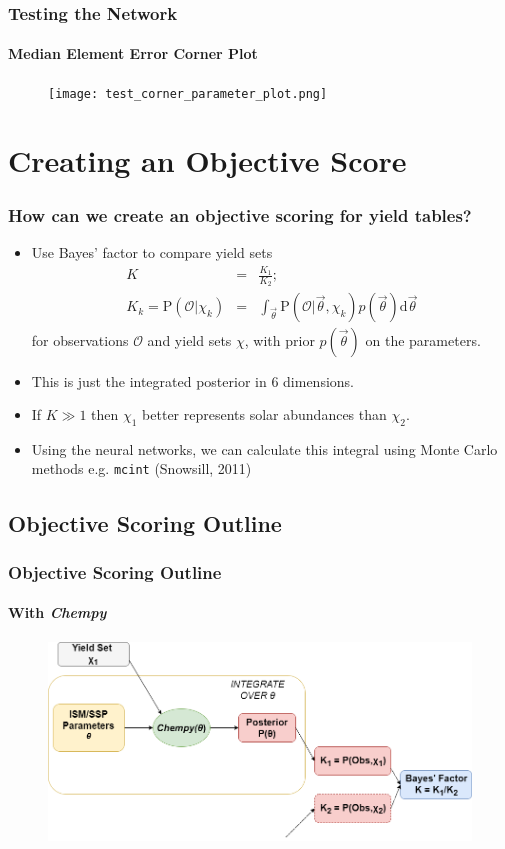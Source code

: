 \documentclass{beamer}
\begin{document}
\begin{frame}
\frametitle{Testing the Network}
\framesubtitle{Median Element Error Corner Plot}
\begin{figure}
\centering
\texttt{[image: test\_corner\_parameter\_plot.png]}
\end{figure}
\end{frame}

\section{Creating an Objective Score}
\begin{frame}
\frametitle{How can we create an objective scoring for yield tables?}
\begin{itemize}
\item Use Bayes' factor to compare yield sets
\begin{eqnarray*}
K &=& \frac{K_1}{K_2};\\
K_k = \mathrm{P}(\mathcal{O}|\chi_k) &=& \int_{\vec{\theta}}\mathrm{P}(\mathcal{O}|\vec{\theta},\chi_k)p(\vec{\theta}) \mathrm{d}\vec{\theta}
\end{eqnarray*}
for observations $\mathcal{O}$ and yield sets $\chi$, with prior $p(\vec{\theta})$ on the parameters.
\item This is just the integrated posterior in 6 dimensions.
\item If $K \gg 1$ then $\chi_1$ better represents solar abundances than $\chi_2$.
\item Using the neural networks, we can calculate this integral using Monte Carlo methods e.g. \texttt{mcint} (Snowsill, 2011)
\end{itemize}
\end{frame}

\subsection{Objective Scoring Outline}
\begin{frame}
\frametitle{Objective Scoring Outline}
\framesubtitle{With \textit{Chempy}}
\begin{figure}
\centering
\includegraphics[width=\textwidth]{Neural.png}
\end{figure}
\end{frame}
\end{document}
